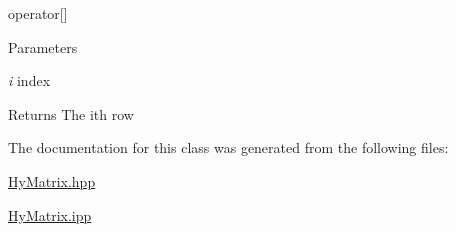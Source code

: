 operator\mbox{[}\mbox{]} 


\begin{DoxyParams}{Parameters}
\item[{\em i}]index \end{DoxyParams}
\begin{DoxyReturn}{Returns}
The ith row 
\end{DoxyReturn}


The documentation for this class was generated from the following files:\begin{DoxyCompactItemize}
\item 
\hyperlink{HyMatrix_8hpp}{HyMatrix.hpp}\item 
\hyperlink{HyMatrix_8ipp}{HyMatrix.ipp}\end{DoxyCompactItemize}
